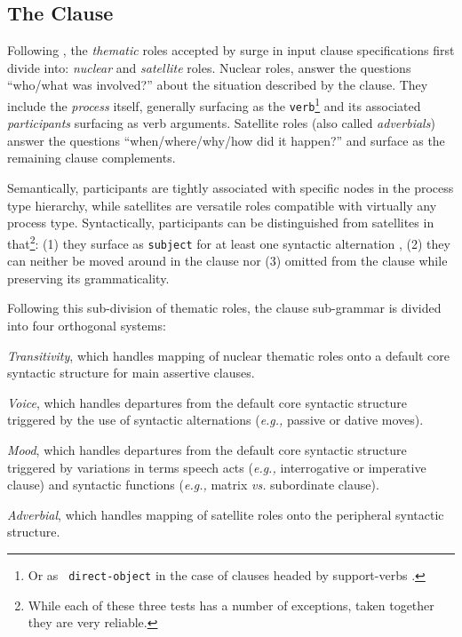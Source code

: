 \subsection{The Clause} 

Following \cite{halliday94}, the {\em thematic} roles accepted by {\sc surge}
in input clause specifications first divide into: {\em nuclear} and {\em
satellite} roles.  Nuclear roles, answer the questions ``who/what was
involved?'' about the situation described by the clause.  They include the {\em
process} itself, generally surfacing as the {\tt verb}\footnote{Or as {\tt
direct-object} in the case of clauses headed by support-verbs \cite{gross84}.}
and its associated {\em participants} surfacing as verb arguments.
Satellite roles (also called {\em adverbials}) answer the questions
``when/where/why/how did it happen?'' and surface as the remaining clause
complements.

Semantically, participants are tightly associated with specific nodes in the
process type hierarchy, while satellites are versatile roles compatible with
virtually any process type. Syntactically, participants can be distinguished
from satellites in that\footnote{While each of these three tests has a number
of exceptions, taken together they are very reliable.}: (1) they surface as
{\tt subject} for at least one syntactic alternation \cite{levin}, (2) they
can neither be moved around in the clause nor (3) omitted from the clause while
preserving its grammaticality. 

Following this sub-division of thematic roles, the clause sub-grammar is
divided into four orthogonal systems:
\begin{zitemize}
\item {\em Transitivity}, which handles mapping of nuclear thematic roles
  onto a default core syntactic structure for main assertive clauses.

\item {\em Voice}, which handles departures from the default core syntactic
  structure triggered by the use of syntactic alternations ({\em e.g.,}
  passive or dative moves).

\item {\em Mood}, which handles departures from the default core syntactic
  structure triggered by variations in terms speech acts ({\em e.g.,}
  interrogative or imperative clause) and syntactic functions ({\em e.g.,}
  matrix {\em vs.} subordinate clause).

\item {\em Adverbial}, which handles mapping of satellite roles onto the
  peripheral syntactic structure.
\end{zitemize}


